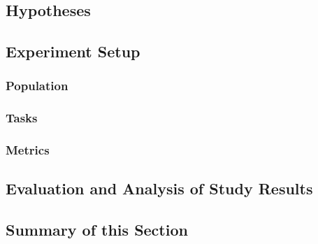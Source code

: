 \subsection{Hypotheses}
\subsection{Experiment Setup}
\subsubsection{Population}
\subsubsection{Tasks}
\subsubsection{Metrics}
\subsection{Evaluation and Analysis of Study Results}

\subsection{Summary of this Section}